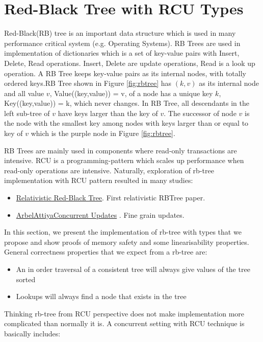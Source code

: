 
\section{Red-Black Tree with RCU Types}
Red-Black(RB)  tree is an important data structure which is used in many performance critical system (e.g. Operating Systems). RB Trees are used in implementation of dictionaries which is a set of key-value pairs with \textsf{Insert}, \textsf{Delete}, \textsf{Read} operations. \textsf{Insert}, \textsf{Delete} are \textsf{update} operations, \textsf{Read} is a \textsf{look up} operation. A RB Tree keeps key-value pairs as its internal nodes, with totally ordered keys.RB Tree shown in Figure \ref{fig:rbtree} has $(k,v)$ as its internal node and all value $v$, \textsf{Value((key,value)) = v}, of a node has a unique key $k$, \textsf{Key((key,value)) = k},  which never changes. In RB Tree, all descendants in  the left sub-tree of $v$ have keys larger than the key of $v$. The successor of node $v$ is the node with the smallest key among nodes with keys larger than or equal to key of $v$ which is the purple node in Figure \ref{fig:rbtree}. 

RB Trees are mainly used in components where read-only transactions are intensive. RCU is a programming-pattern which scales up performance when read-only operations are intensive. Naturally, exploration of rb-tree implementation with RCU pattern resulted in many studies:
\begin{itemize}
\item \href{http://www.pdx.edu/sites/www.pdx.edu.computer-science/files/tr1006.pdf}{Relativistic Red-Black Tree}. First relativistic RBTree paper.
\item \href{http://www.cs.technion.ac.il/~mayaarl/full-version.pdf}{ArbelAttiyaConcurrent Updates} . Fine grain updates.
\end{itemize}
In this section, we present the implementation of rb-tree with types that we propose and show proofs of memory safety and some linearisability properties. General correctness properties that we expect from a rb-tree are:
\begin{itemize}
\item An in order traversal of a consistent tree will always give values of the tree sorted
\item Lookups will always find a node that exists in the tree
\end{itemize}
Thinking rb-tree from RCU perspective does not make implementation more complicated than normally it is.  A concurrent setting with RCU technique is basically includes:
